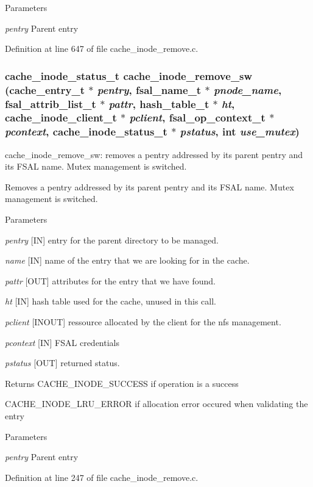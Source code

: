 \begin{DoxyParams}{Parameters}
\item[{\em pentry}]Parent entry \end{DoxyParams}


Definition at line 647 of file cache\_\-inode\_\-remove.c.
\subsubsection[{cache\_\-inode\_\-remove\_\-sw}]{\setlength{\rightskip}{0pt plus 5cm}cache\_\-inode\_\-status\_\-t cache\_\-inode\_\-remove\_\-sw (cache\_\-entry\_\-t $\ast$ {\em pentry}, \/  fsal\_\-name\_\-t $\ast$ {\em pnode\_\-name}, \/  fsal\_\-attrib\_\-list\_\-t $\ast$ {\em pattr}, \/  hash\_\-table\_\-t $\ast$ {\em ht}, \/  cache\_\-inode\_\-client\_\-t $\ast$ {\em pclient}, \/  fsal\_\-op\_\-context\_\-t $\ast$ {\em pcontext}, \/  cache\_\-inode\_\-status\_\-t $\ast$ {\em pstatus}, \/  int {\em use\_\-mutex})}\label{cache__inode__remove_8c_a3a3242748669826a54bf59b571a93640}
cache\_\-inode\_\-remove\_\-sw: removes a pentry addressed by its parent pentry and its FSAL name. Mutex management is switched.

Removes a pentry addressed by its parent pentry and its FSAL name. Mutex management is switched.


\begin{DoxyParams}{Parameters}
\item[{\em pentry}][IN] entry for the parent directory to be managed. \item[{\em name}][IN] name of the entry that we are looking for in the cache. \item[{\em pattr}][OUT] attributes for the entry that we have found. \item[{\em ht}][IN] hash table used for the cache, unused in this call. \item[{\em pclient}][INOUT] ressource allocated by the client for the nfs management. \item[{\em pcontext}][IN] FSAL credentials \item[{\em pstatus}][OUT] returned status.\end{DoxyParams}
\begin{DoxyReturn}{Returns}
CACHE\_\-INODE\_\-SUCCESS if operation is a success \par
 

CACHE\_\-INODE\_\-LRU\_\-ERROR if allocation error occured when validating the entry 
\end{DoxyReturn}

\begin{DoxyParams}{Parameters}
\item[{\em pentry}]Parent entry \end{DoxyParams}


Definition at line 247 of file cache\_\-inode\_\-remove.c.